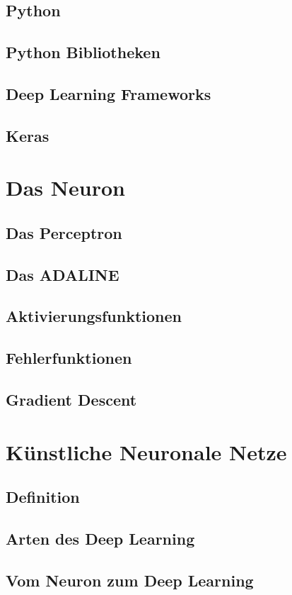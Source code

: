 \documentclass[conference, german]{IEEEtran}
\begin{document}
\subsection{Python}
\subsection{Python Bibliotheken}
\subsection{Deep Learning Frameworks}
\subsection{Keras}
\section{Das Neuron}
\subsection{Das Perceptron}
\subsection{Das ADALINE}
\subsection{Aktivierungsfunktionen}
\subsection{Fehlerfunktionen  }
\subsection{Gradient Descent}
\section{Künstliche Neuronale Netze}
\subsection{Definition}
\subsection{Arten des Deep Learning}
\subsection{Vom Neuron zum Deep Learning}
\end{document}
